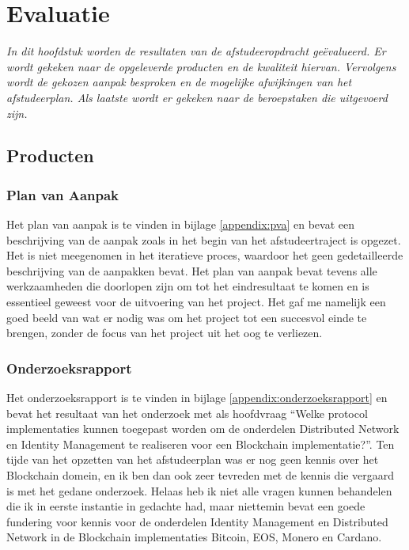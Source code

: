 \chapter{Evaluatie}

\textit{In dit hoofdstuk worden de resultaten van de afstudeeropdracht geëvalueerd. Er wordt gekeken naar de opgeleverde producten en de kwaliteit hiervan. Vervolgens wordt de gekozen aanpak besproken en de mogelijke afwijkingen van het afstudeerplan. Als laatste wordt er gekeken naar de beroepstaken die uitgevoerd zijn.}

\section{Producten}

\subsection{Plan van Aanpak}

Het plan van aanpak is te vinden in bijlage \ref{appendix:pva} en bevat een beschrijving van de aanpak zoals in het begin van het afstudeertraject is opgezet. Het is niet meegenomen in het iteratieve proces, waardoor het geen gedetailleerde beschrijving van de aanpakken bevat. Het plan van aanpak bevat tevens alle werkzaamheden die doorlopen zijn om tot het eindresultaat te komen en is essentieel geweest voor de uitvoering van het project. Het gaf me namelijk een goed beeld van wat er nodig was om het project tot een succesvol einde te brengen, zonder de focus van het project uit het oog te verliezen.

\subsection{Onderzoeksrapport}

Het onderzoeksrapport is te vinden in bijlage \ref{appendix:onderzoeksrapport} en bevat het resultaat van het onderzoek met als hoofdvraag ``Welke protocol implementaties kunnen toegepast worden om de onderdelen Distributed Network en Identity Management te realiseren voor een Blockchain implementatie?''. Ten tijde van het opzetten van het afstudeerplan was er nog geen kennis over het Blockchain domein, en ik ben dan ook zeer tevreden met de kennis die vergaard is met het gedane onderzoek. Helaas heb ik niet alle vragen kunnen behandelen die ik in eerste instantie in gedachte had, maar niettemin bevat een goede fundering voor kennis voor de onderdelen Identity Management en Distributed Network in de Blockchain implementaties Bitcoin, EOS, Monero en Cardano. 

